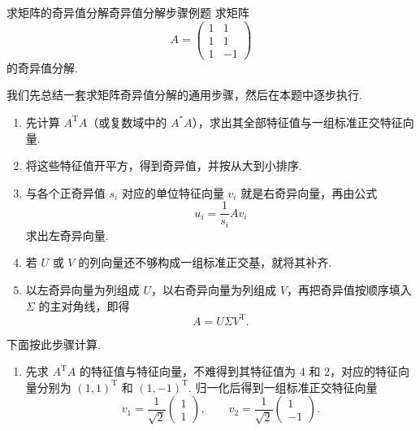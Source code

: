 \begin{example}{求矩阵的奇异值分解}{奇异值分解步骤例题}
    求矩阵
    \[
        A = \begin{pmatrix}
            1 & 1  \\
            1 & 1  \\
            1 & -1
        \end{pmatrix}
    \]
    的奇异值分解.
\end{example}

\begin{solution}
    我们先总结一套求矩阵奇异值分解的通用步骤，然后在本题中逐步执行.

    \begin{enumerate}
        \item 先计算 $A^{\mathrm{T}}A$（或复数域中的 $A^*A$），求出其全部特征值与一组标准正交特征向量.

        \item 将这些特征值开平方，得到奇异值，并按从大到小排序.

        \item 与各个正奇异值 $s_i$ 对应的单位特征向量 $v_i$ 就是右奇异向量，再由公式
              \[
                  u_i = \frac{1}{s_i}Av_i
              \]
              求出左奇异向量.

        \item 若 $U$ 或 $V$ 的列向量还不够构成一组标准正交基，就将其补齐.

        \item 以左奇异向量为列组成 $U$，以右奇异向量为列组成 $V$，再把奇异值按顺序填入 $\Sigma$ 的主对角线，即得
              \[
                  A = U\Sigma V^{\mathrm{T}}.
              \]
    \end{enumerate}

    下面按此步骤计算.

    \begin{enumerate}
        \item 先求 $A^{\mathrm{T}}A$ 的特征值与特征向量，不难得到其特征值为 $4$ 和 $2$，对应的特征向量分别为 $(1, 1)^{\mathrm{T}}$ 和 $(1, -1)^{\mathrm{T}}$. 归一化后得到一组标准正交特征向量
              \[
                  v_1 = \frac{1}{\sqrt{2}}\begin{pmatrix}
                      1 \\
                      1
                  \end{pmatrix},\qquad
                  v_2 = \frac{1}{\sqrt{2}}\begin{pmatrix}
                      1  \\
                      -1
                  \end{pmatrix}.
              \]


\end{enumerate}
\end{solution}
